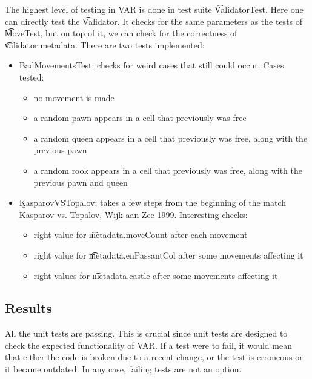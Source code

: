 The highest level of testing in VAR is done in test suite \t{ValidatorTest}. Here one can directly test the \t{Validator}. It checks for the same parameters as the tests of \t{MoveTest}, but on top of it, we can check for the correctness of \t{validator.metadata}. There are two tests implemented:

\begin{itemize}
    \item \b{BadMovementsTest}: checks for weird cases that still could occur. Cases tested:
    \begin{itemize}
        \item no movement is made
        \item a random pawn appears in a cell that previously was free
        \item a random queen appears in a cell that previously was free, along with the previous pawn
        \item a random rook appears in a cell that previously was free, along with the previous pawn and queen
    \end{itemize}

    \item \b{KasparovVSTopalov}: takes a few steps from the beginning of the match \href{https://www.chess.com/article/view/the-best-chess-games-of-all-time#Kasparov_Topalov}{Kasparov vs. Topalov, Wijk aan Zee 1999}. Interesting checks:
    \begin{itemize}
        \item right value for \t{metadata.moveCount} after each movement
        \item right value for \t{metadata.enPassantCol} after some movements affecting it
        \item right values for \t{metadata.castle} after some movements affecting it
    \end{itemize}
\end{itemize}



\subsection{Results} \label{sec:var-results}

\b{All the unit tests are passing}. This is crucial since unit tests are designed to check the expected functionality of VAR. If a test were to fail, it would mean that either the code is broken due to a recent change, or the test is erroneous or it became outdated. In any case, failing tests are not an option.



